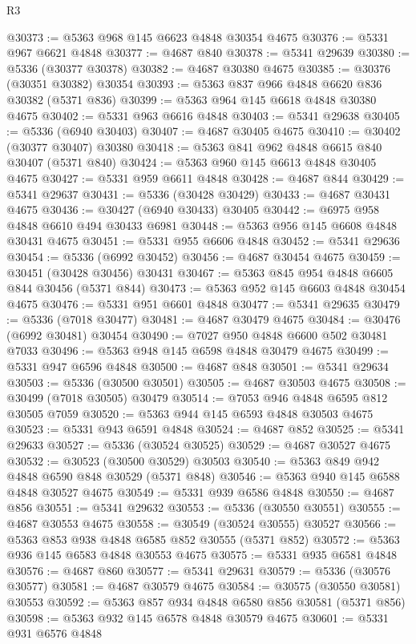 \begin{lexlean}{R3}
\begin{coremodule}
@30373 := @5363 @968 @145 @6623 @4848 @30354 @4675
@30376 := @5331 @967 @6621 @4848
@30377 := @4687 @840
@30378 := @5341 @29639
@30380 := @5336 (@30377 @30378)
@30382 := @4687 @30380 @4675
@30385 := @30376 (@30351 @30382) @30354
@30393 := @5363 @837 @966 @4848 @6620 @836 @30382 (@5371 @836)
@30399 := @5363 @964 @145 @6618 @4848 @30380 @4675
@30402 := @5331 @963 @6616 @4848
@30403 := @5341 @29638
@30405 := @5336 (@6940 @30403)
@30407 := @4687 @30405 @4675
@30410 := @30402 (@30377 @30407) @30380
@30418 := @5363 @841 @962 @4848 @6615 @840 @30407 (@5371 @840)
@30424 := @5363 @960 @145 @6613 @4848 @30405 @4675
@30427 := @5331 @959 @6611 @4848
@30428 := @4687 @844
@30429 := @5341 @29637
@30431 := @5336 (@30428 @30429)
@30433 := @4687 @30431 @4675
@30436 := @30427 (@6940 @30433) @30405
@30442 := @6975 @958 @4848 @6610 @494 @30433 @6981
@30448 := @5363 @956 @145 @6608 @4848 @30431 @4675
@30451 := @5331 @955 @6606 @4848
@30452 := @5341 @29636
@30454 := @5336 (@6992 @30452)
@30456 := @4687 @30454 @4675
@30459 := @30451 (@30428 @30456) @30431
@30467 := @5363 @845 @954 @4848 @6605 @844 @30456 (@5371 @844)
@30473 := @5363 @952 @145 @6603 @4848 @30454 @4675
@30476 := @5331 @951 @6601 @4848
@30477 := @5341 @29635
@30479 := @5336 (@7018 @30477)
@30481 := @4687 @30479 @4675
@30484 := @30476 (@6992 @30481) @30454
@30490 := @7027 @950 @4848 @6600 @502 @30481 @7033
@30496 := @5363 @948 @145 @6598 @4848 @30479 @4675
@30499 := @5331 @947 @6596 @4848
@30500 := @4687 @848
@30501 := @5341 @29634
@30503 := @5336 (@30500 @30501)
@30505 := @4687 @30503 @4675
@30508 := @30499 (@7018 @30505) @30479
@30514 := @7053 @946 @4848 @6595 @812 @30505 @7059
@30520 := @5363 @944 @145 @6593 @4848 @30503 @4675
@30523 := @5331 @943 @6591 @4848
@30524 := @4687 @852
@30525 := @5341 @29633
@30527 := @5336 (@30524 @30525)
@30529 := @4687 @30527 @4675
@30532 := @30523 (@30500 @30529) @30503
@30540 := @5363 @849 @942 @4848 @6590 @848 @30529 (@5371 @848)
@30546 := @5363 @940 @145 @6588 @4848 @30527 @4675
@30549 := @5331 @939 @6586 @4848
@30550 := @4687 @856
@30551 := @5341 @29632
@30553 := @5336 (@30550 @30551)
@30555 := @4687 @30553 @4675
@30558 := @30549 (@30524 @30555) @30527
@30566 := @5363 @853 @938 @4848 @6585 @852 @30555 (@5371 @852)
@30572 := @5363 @936 @145 @6583 @4848 @30553 @4675
@30575 := @5331 @935 @6581 @4848
@30576 := @4687 @860
@30577 := @5341 @29631
@30579 := @5336 (@30576 @30577)
@30581 := @4687 @30579 @4675
@30584 := @30575 (@30550 @30581) @30553
@30592 := @5363 @857 @934 @4848 @6580 @856 @30581 (@5371 @856)
@30598 := @5363 @932 @145 @6578 @4848 @30579 @4675
@30601 := @5331 @931 @6576 @4848

\end{coremodule}
\end{lexlean}
